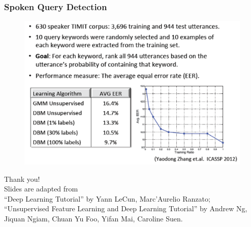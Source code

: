 \documentclass{beamer}
\newcommand{\hide}[1]{} %
\begin{document}
\begin{frame}
\frametitle{Spoken Query Detection}
\begin{figure}
      \includegraphics[width=1\textwidth]{figs/query.png}
\end{figure}
\end{frame}

\hide{
\begin{frame}
\frametitle{Conclusion}
\begin{itemize}
    \item Neural Network
        \begin{itemize}
          \item Forward propagation
          \item Backpropagation
          \item Autoencoder
        \end{itemize}
        \item Deep Network
        \begin{itemize}
          \item Unsupervised Feature Learning
          \item Deep Network
          \item Stacked autoencoder
        \end{itemize}
        \item Boltzamann Machine
        \begin{itemize}
        \item General Boltzamann Machine
        \item Restricted Boltzamann Machine
        \item Deep Boltzamann Machine
        \end{itemize}
  \end{itemize}
\end{frame}
}

\begin{frame}
\centering Thank you! \\ 
\footnotesize
Slides are adapted from\\ ``Deep Learning Tutorial'' by Yann LeCun, Marc'Aurelio Ranzato; \\ ``Unsupervised Feature Learning and Deep Learning Tutorial'' by Andrew Ng, Jiquan Ngiam, Chuan Yu Foo, Yifan Mai, Caroline Suen.
\end{frame}
\end{document}
